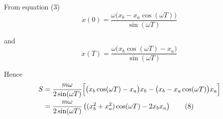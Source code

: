From equation (3)
\begin{equation*}
\dot x(0)=\frac{\omega\bigl(x_b-x_a\cos(\omega T)\bigr)}{\sin(\omega T)}
\tag{6}
\end{equation*}

and
\begin{equation*}
\dot x(T)=\frac{\omega\bigl(x_b\cos(\omega T)-x_a\bigr)}{\sin(\omega T)}
\tag{7}
\end{equation*}

Hence
\begin{align*}
S&=\frac{m\omega}{2\sin(\omega T)}\Bigl[
\bigl(x_b\cos(\omega T)-x_a\bigr)x_b
-\bigl(x_b-x_a\cos(\omega T)\bigr)x_a
\Bigr]
\\
&=\frac{m\omega}{2\sin(\omega T)}
\left((x_b^2+x_a^2)\cos(\omega T)-2x_b x_a\right)
\tag{8}
\end{align*}


